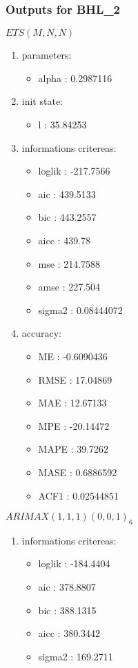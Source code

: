 \documentclass[10pt,a4paper]{article}\usepackage[]{graphicx}\usepackage[]{color}
\newcommand{\AaA}{\_}
\begin{document}
\subsubsection{Outputs for BHL\AaA 2}
\begin{multicols}{2}


$ ETS(M,N,N) $
\begin{enumerate}
\item parameters:
\begin{itemize}
\item  alpha :  0.2987116 
\end{itemize}
\item init state:
\begin{itemize}
\item  l :  35.84253 
\end{itemize}
\item informations critereas:
\begin{itemize}
\item  loglik :  -217.7566 
\item  aic :  439.5133 
\item  bic :  443.2557 
\item  aicc :  439.78 
\item  mse :  214.7588 
\item  amse :  227.504 
\item  sigma2 :  0.08444072 
\end{itemize}
\item accuracy:
\begin{itemize}
\item  ME :  -0.6090436 
\item  RMSE :  17.04869 
\item  MAE :  12.67133 
\item  MPE :  -20.14472 
\item  MAPE :  39.7262 
\item  MASE :  0.6886592 
\item  ACF1 :  0.02544851 
\end{itemize}
\end{enumerate}

\columnbreak


 $ARIMAX(1,1,1)(0,0,1)_{6}$ 
\begin{enumerate}
\item informations critereas:
\begin{itemize}
\item  loglik :  -184.4404 
\item  aic :  378.8807 
\item  bic :  388.1315 
\item  aicc :  380.3442 
\item  sigma2 :  169.2711 
\end{itemize}


\end{enumerate}
\end{multicols}
\end{document}
